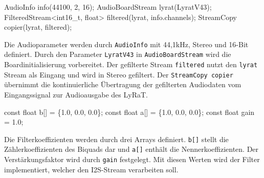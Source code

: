 \documentclass[
  ngerman,
  letterpaper,
  DIV=11]{scrreprt}
\newenvironment{Shaded}{\begin{snugshade}}{\end{snugshade}}
\newcommand{\AttributeTok}[1]{\textcolor[rgb]{0.40,0.45,0.13}{#1}}
\newcommand{\DataTypeTok}[1]{\textcolor[rgb]{0.68,0.00,0.00}{#1}}
\newcommand{\DecValTok}[1]{\textcolor[rgb]{0.68,0.00,0.00}{#1}}
\newcommand{\FloatTok}[1]{\textcolor[rgb]{0.68,0.00,0.00}{#1}}
\newcommand{\NormalTok}[1]{\textcolor[rgb]{0.00,0.23,0.31}{#1}}
\newcommand{\OperatorTok}[1]{\textcolor[rgb]{0.37,0.37,0.37}{#1}}
\begin{document}
\begin{Shaded}
\begin{Highlighting}[]
\NormalTok{AudioInfo info}\OperatorTok{(}\DecValTok{44100}\OperatorTok{,} \DecValTok{2}\OperatorTok{,} \DecValTok{16}\OperatorTok{);}
\NormalTok{AudioBoardStream lyrat}\OperatorTok{(}\NormalTok{LyratV43}\OperatorTok{);}
\NormalTok{FilteredStream}\OperatorTok{\textless{}}\DataTypeTok{int16\_t}\OperatorTok{,} \DataTypeTok{float}\OperatorTok{\textgreater{}}\NormalTok{ filtered}\OperatorTok{(}\NormalTok{lyrat}\OperatorTok{,}\NormalTok{ info}\OperatorTok{.}\NormalTok{channels}\OperatorTok{);}
\NormalTok{StreamCopy copier}\OperatorTok{(}\NormalTok{lyrat}\OperatorTok{,}\NormalTok{ filtered}\OperatorTok{);}
\end{Highlighting}
\end{Shaded}

Die Audioparameter werden durch \texttt{AudioInfo} mit 44,1kHz, Stereo
und 16-Bit definiert. Durch den Parameter \texttt{LyratV43} in
\texttt{AudioBoardStream} wird die Boardinitialisierung vorbereitet. Der
gefilterte Stream \texttt{filtered} nutzt den \texttt{lyrat} Stream als
Eingang und wird in Stereo gefiltert. Der \texttt{StreamCopy\ copier}
übernimmt die kontinuierliche Übertragung der gefilterten Audiodaten vom
Eingangssignal zur Audioausgabe des LyRaT.

\begin{Shaded}
\begin{Highlighting}[]
\AttributeTok{const} \DataTypeTok{float}\NormalTok{ b}\OperatorTok{[]} \OperatorTok{=} \OperatorTok{\{}\FloatTok{1.0}\OperatorTok{,} \FloatTok{0.0}\OperatorTok{,} \FloatTok{0.0}\OperatorTok{\};}
\AttributeTok{const} \DataTypeTok{float}\NormalTok{ a}\OperatorTok{[]} \OperatorTok{=} \OperatorTok{\{}\FloatTok{1.0}\OperatorTok{,} \FloatTok{0.0}\OperatorTok{,} \FloatTok{0.0}\OperatorTok{\};}
\AttributeTok{const} \DataTypeTok{float}\NormalTok{ gain }\OperatorTok{=} \FloatTok{1.0}\OperatorTok{;}
\end{Highlighting}
\end{Shaded}

Die Filterkoeffizienten werden durch drei Arrays definiert.
\texttt{b{[}{]}} stellt die Zählerkoeffizienten des Biquads dar und
\texttt{a{[}{]}} enthält die Nennerkoeffizienten. Der Verstärkungsfaktor
wird durch \texttt{gain} festgelegt. Mit diesen Werten wird der Filter
implementiert, welcher den I2S-Stream verarbeiten soll.
\end{document}
